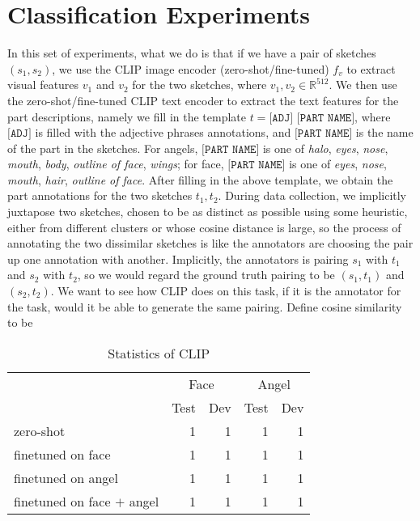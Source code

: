 
\section{Classification Experiments}
In this set of experiments, what we do is that if we have a pair of sketches $(s_1,s_2)$, we use the CLIP image encoder (zero-shot/fine-tuned) $f_v$ to extract visual features $v_1$ and $v_2$ for the two sketches, where $v_1,v_2 \in \mathbb{R}^{512}$. We then use the zero-shot/fine-tuned CLIP text encoder to extract the text features for the part descriptions, namely we fill in the template $t = \texttt{[ADJ] [PART NAME]}$, where $\texttt{[ADJ]}$ is filled with the adjective phrases annotations, and $\texttt{[PART NAME]}$ is the name of the part in the sketches. For angels, $\texttt{[PART NAME]}$ is one of \textit{halo}, \textit{eyes}, \textit{nose}, \textit{mouth}, \textit{body}, \textit{outline of face}, \textit{wings}; for face, $\texttt{[PART NAME]}$ is one of \textit{eyes}, \textit{nose}, \textit{mouth}, \textit{hair}, \textit{outline of face}. After filling in the above template, we obtain the part annotations for the two sketches $t_1,t_2$.  
During data collection, we implicitly juxtapose two sketches, chosen to be as distinct as possible using some heuristic, either from different clusters or whose cosine distance is large, so the process of annotating the two dissimilar sketches is like the annotators are choosing the pair up one annotation with another. Implicitly, the annotators is pairing $s_1$ with $t_1$ and $s_2$ with $t_2$, so we would regard the ground truth pairing to be $(s_1,t_1)$ and $(s_2,t_2)$. We want to see how CLIP does on this task, if it is the annotator for the task, would it be able to generate the same pairing. Define cosine similarity to be        



\begin{table}[ht!]
\begin{minipage}{1\textwidth}
\begin{center}
{\small
\begin{tabular}{lrrrr}
\toprule
& \multicolumn{2}{c}{Face} & \multicolumn{2}{c}{Angel}\\
~ & Test & Dev & Test & Dev \\
\midrule
zero-shot & 1 & 1 & 1 & 1 \\
finetuned on face & 1 & 1 & 1 & 1 \\
finetuned on angel & 1 & 1 & 1 & 1 \\
finetuned on face $+$ angel & 1 & 1 & 1 & 1\\
\bottomrule
\end{tabular}}
\caption{Statistics of CLIP}
\label{table:clip_results_table}
\end{center}
\end{minipage}
\end{table}
